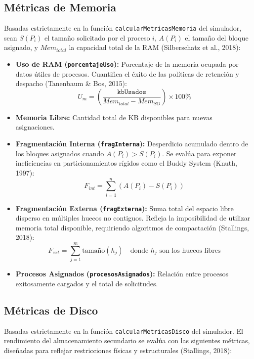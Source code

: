 \documentclass[12pt,a4paper]{article}
\begin{document}
\subsection{Métricas de Memoria}
Basadas estrictamente en la función \texttt{calcularMetricasMemoria} del simulador, sean $S(P_i)$ el tamaño solicitado por el proceso $i$, $A(P_i)$ el tamaño del bloque asignado, y $Mem_{total}$ la capacidad total de la RAM (Silberschatz et al., 2018):

\begin{itemize}
    \item \textbf{Uso de RAM (\texttt{porcentajeUso}):} Porcentaje de la memoria ocupada por datos útiles de procesos. Cuantifica el éxito de las políticas de retención y despacho (Tanenbaum \& Bos, 2015):
    \begin{equation}
        U_m = \left( \frac{\texttt{kbUsados}}{Mem_{total} - Mem_{SO}} \right) \times 100\%
    \end{equation}
    \item \textbf{Memoria Libre:} Cantidad total de KB disponibles para nuevas asignaciones.
    \item \textbf{Fragmentación Interna (\texttt{fragInterna}):} Desperdicio acumulado dentro de los bloques asignados cuando $A(P_i) > S(P_i)$. Se evalúa para exponer ineficiencias en particionamientos rígidos como el Buddy System (Knuth, 1997):
    \begin{equation}
        F_{int} = \sum_{i=1}^{n} \left( A(P_i) - S(P_i) \right)
    \end{equation}
    \item \textbf{Fragmentación Externa (\texttt{fragExterna}):} Suma total del espacio libre disperso en múltiples huecos no contiguos. Refleja la imposibilidad de utilizar memoria total disponible, requiriendo algoritmos de compactación (Stallings, 2018):
    \begin{equation}
        F_{ext} = \sum_{j=1}^{m} \text{tamaño}(h_j) \quad \text{donde } h_j \text{ son los huecos libres}
    \end{equation}
    \item \textbf{Procesos Asignados (\texttt{procesosAsignados}):} Relación entre procesos exitosamente cargados y el total de solicitudes.
\end{itemize}

\subsection{Métricas de Disco}
Basadas estrictamente en la función \texttt{calcularMetricasDisco} del simulador. El rendimiento del almacenamiento secundario se evalúa con las siguientes métricas, diseñadas para reflejar restricciones físicas y estructurales (Stallings, 2018):
\end{document}
